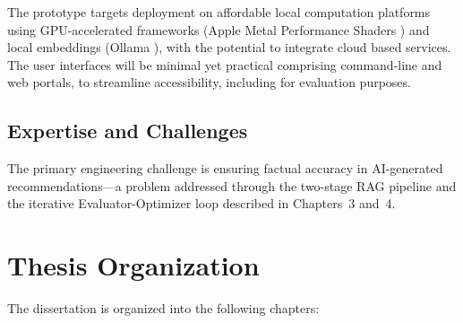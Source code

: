 The prototype targets deployment on affordable local computation platforms using GPU-accelerated frameworks (Apple Metal Performance Shaders \cite{apple2024mps}) and local embeddings (Ollama \cite{ollama2024web}), with the potential to integrate cloud based services. The user interfaces will be minimal yet practical comprising command-line and web portals, to streamline accessibility, including for evaluation purposes.

\subsection{Expertise and Challenges}

The primary engineering challenge is ensuring factual accuracy in AI-generated recommendations---a problem addressed through the two-stage RAG pipeline and the iterative Evaluator-Optimizer loop described in Chapters~3 and~4.

\section{Thesis Organization}

The dissertation is organized into the following chapters:

